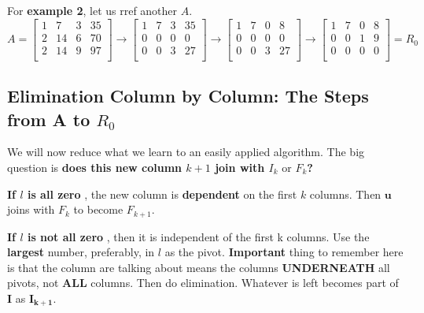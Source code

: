 For \textbf{example 2}, let us rref another \(A\). 
\[
    A = 
    \begin{bmatrix}
        1 & 7 & 3 & 35  \\
        2 & 14 & 6 & 70  \\
        2 & 14 & 9 & 97  \\
    \end{bmatrix}
    \rightarrow
    \begin{bmatrix}
        1 & 7 & 3 & 35  \\
        0 & 0 & 0 & 0  \\
        0 & 0 & 3 & 27  \\
    \end{bmatrix}
    \rightarrow
    \begin{bmatrix}
        1 & 7 & 0 & 8  \\
        0 & 0 & 0 & 0  \\
        0 & 0 & 3 & 27  \\
    \end{bmatrix}
    \rightarrow
    \begin{bmatrix}
        1 & 7 & 0 & 8  \\
        0 & 0 & 1 & 9  \\
        0 & 0 & 0 & 0  \\
    \end{bmatrix}
    = R_0
\] 

\subsection{Elimination Column by Column: The Steps from A to \(R_0\) }

We will now reduce what we learn to an easily applied algorithm. 
The big question is \textbf{does this new column \(k + 1\) join with \(I_k \text{ or } F_k\)?}

\textbf{If \(l\) is all zero }, the new column is \textbf{dependent} on the first \(k\) columns. Then \(\mathbf{u} \) joins with \(F_k\) to become \(F_{k+1} \). 

\textbf{If \(l\) is not all zero }, then it is independent of the first k columns. Use the \textbf{largest} number, preferably, in \(l\) as the pivot. \textbf{Important} thing to remember here is that the column are talking about means the columns \textbf{UNDERNEATH} all pivots, not \textbf{ALL} columns. Then do elimination. Whatever is left becomes part of \(\mathbf{I} \) as \(\mathbf{I_{k+1} }  \). 
 
